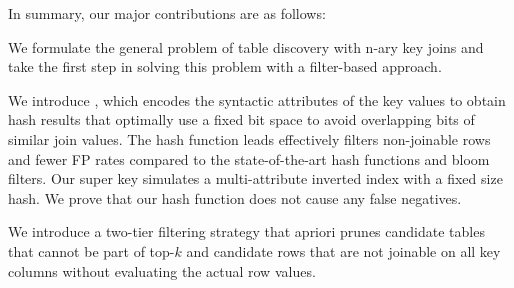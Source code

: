 In summary, our major contributions are as follows: 
\begin{packed_enum}
\item We formulate the general problem of table discovery with n-ary key joins and take the first step in solving this problem with a filter-based approach. 
\item We introduce \hash, which encodes the syntactic attributes of the key values to obtain hash results that optimally use a fixed bit space to avoid overlapping bits of similar join values. The hash function leads effectively filters non-joinable rows and fewer FP rates compared to the state-of-the-art hash functions and bloom filters.
Our super key simulates a multi-attribute inverted index with a fixed size hash.
We prove that our hash function does not cause any false negatives.
\item We introduce a two-tier filtering strategy that apriori prunes candidate tables that cannot be part of top-$k$ and candidate rows that are not joinable on all key columns without evaluating the actual row values.
\end{packed_enum}

